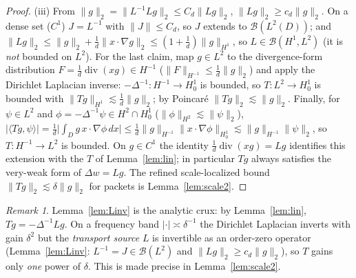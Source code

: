 \documentclass[11pt]{article}
\theoremstyle{remark}
\newtheorem{remark}[theorem]{Remark}
\newcommand{\norm}[1]{\lVert #1\rVert}
\newcommand{\abs}[1]{\lvert #1\rvert}
\newcommand{\inner}[2]{\langle #1,#2\rangle}
\DeclareMathOperator{\diver}{div}
\begin{document}
\begin{proof}
(iii) From $\norm{g}_{2}=\norm{L^{-1}Lg}_{2}\le C_d\norm{Lg}_{2}$,
$\norm{Lg}_{2}\ge c_d\norm{g}_{2}$. On a dense set ($C^{1}$) $J=L^{-1}$
with $\norm J\le C_d$, so $J$ extends to $\mathcal B(L^{2}(D))$; and
$\norm{Lg}_{2}\le\norm{g}_{2}+\frac1d\norm{x\cdot\nabla g}_{2}
\le(1+\frac1d)\norm{g}_{H^{1}}$, so $L\in\mathcal B(H^{1},L^{2})$ (it is
\emph{not} bounded on $L^{2}$). For the last claim, map
$g\in L^{2}$ to the divergence-form distribution $F=\frac1d\diver(xg)\in
H^{-1}$ ($\norm{F}_{H^{-1}}\le\frac1d\norm{g}_2$) and apply the Dirichlet
Laplacian inverse: $-\Delta^{-1}:H^{-1}\to H^{1}_{0}$ is bounded, so
$T:L^{2}\to H^{1}_{0}$ is bounded with
$\norm{Tg}_{H^{1}}\lesssim\frac1d\norm{g}_2$; by Poincar\'e
$\norm{Tg}_{2}\lesssim\norm{g}_{2}$. Finally, for $\psi\in L^{2}$ and
$\phi=-\Delta^{-1}\psi\in H^{2}\cap H^{1}_{0}$
($\norm{\phi}_{H^{2}}\lesssim\norm{\psi}_2$),
$\abs{\inner{Tg}{\psi}}=\frac1d\abs{\int_D g\,x\cdot\nabla\phi\,dx}
\le\frac1d\norm{g}_{H^{-1}}\norm{x\cdot\nabla\phi}_{H^{1}_0}
\lesssim\norm{g}_{H^{-1}}\norm{\psi}_2$, so
$T:H^{-1}\to L^{2}$ is bounded.
On $g\in C^{1}$ the identity $\frac1d\diver(xg)=Lg$ identifies this
extension with the $T$ of Lemma~\ref{lem:lin}; in particular $Tg$ always
satisfies the very-weak form of $\Delta w=Lg$. The refined scale-localized
bound $\norm{Tg}_{2}\lesssim\delta\norm{g}_{2}$ for packets is
Lemma~\ref{lem:scale2}.
\end{proof}

\begin{remark}\label{rem:crux}
Lemma~\ref{lem:Linv} is the analytic crux: by Lemma~\ref{lem:lin},
$Tg=-\Delta^{-1}Lg$. On a frequency band $\abs{\cdot}\asymp\delta^{-1}$ the
Dirichlet Laplacian inverts with gain $\delta^{2}$ but the \emph{transport
source} $L$ is invertible as an order-zero operator (Lemma~\ref{lem:Linv}:
$L^{-1}=J\in\mathcal B(L^{2})$ and $\norm{Lg}_2\ge c_d\norm{g}_2$), so $T$ gains only
\emph{one} power of $\delta$. This is made precise in
Lemma~\ref{lem:scale2}.
\end{remark}
\end{document}
